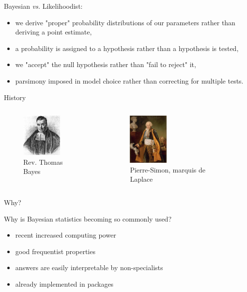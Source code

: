 \begin{frame}{Bayesian \textit{vs.} Likelihoodist:}

	\begin{itemize}
		\item we derive "proper" probability distributions of our parameters 
		rather than deriving a point estimate,
		\item a probability is assigned to a hypothesis rather than a hypothesis is tested,
		\item we "accept" the null hypothesis rather than "fail to reject" it,
		\item parsimony imposed in model choice rather than correcting for multiple tests.
	\end{itemize}

\end{frame}

\begin{frame}{History}

	\begin{columns}
		\begin{figure}
			\includegraphics[width=2cm]{Images/ThomasBayes.jpeg}
			\caption{Rev. Thomas Bayes}
		\end{figure}
		\begin{figure}
			\includegraphics[width=2cm]{Images/Laplace.jpg}
			\caption{Pierre-Simon, marquis de Laplace}
		\end{figure}
	\end{columns}

\end{frame}

\begin{frame}{Why?}

	\begin{block}{Why is Bayesian statistics becoming so commonly used?}
		\begin{itemize}
			\item recent increased computing power
			\item good frequentist properties
			\item answers are easily interpretable by non-specialists
			\item already implemented in packages
		\end{itemize}
	\end{block}

\end{frame}

